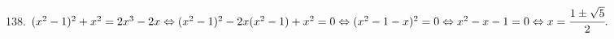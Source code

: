 138. $(x^2-1)^2+x^2=2x^3-2x\Leftrightarrow(x^2-1)^2-2x(x^2-1)+x^2=0\Leftrightarrow (x^2-1-x)^2=0\Leftrightarrow x^2-x-1=0\Leftrightarrow x=\cfrac{1\pm\sqrt{5}}{2}.$\\
